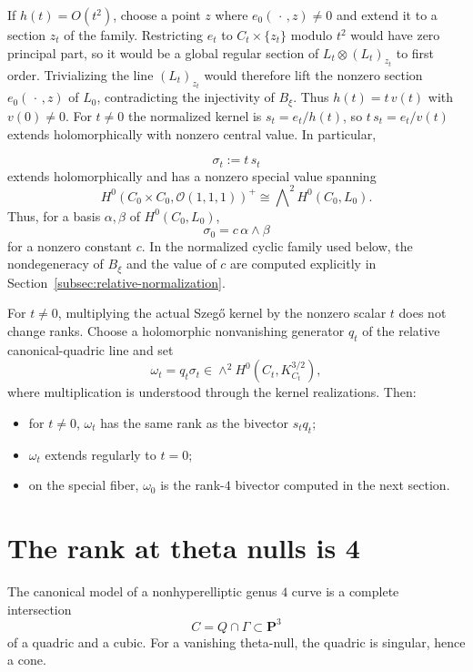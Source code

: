 \documentclass[10pt,a4paper]{amsart}
\newcommand{\OO}{\mathcal O}
\begin{document}
If $h(t)=O(t^2)$, choose a point $z$ where
$e_0(\,\cdot\,,z)\neq0$ and extend it to a section $z_t$ of the family.
Restricting $e_t$ to $C_t\times\{z_t\}$ modulo $t^2$ would have
zero principal part, so it would be a global regular section of
$L_t\otimes(L_t)_{z_t}$ to first order. Trivializing the line
$(L_t)_{z_t}$ would therefore lift the nonzero section
$e_0(\,\cdot\,,z)$ of $L_0$, contradicting the injectivity of $B_\xi$.
Thus $h(t)=t\,v(t)$ with $v(0)\neq0$. For $t\neq0$ the normalized
kernel is $s_t=e_t/h(t)$, so $t\,s_t=e_t/v(t)$ extends holomorphically
with nonzero central value. In particular,
\endgroup

\[
\sigma_t:=t\,s_t
\]
extends holomorphically and has a nonzero special value spanning
\[
{H^0(C_0\times C_0,\OO(1,1,1))^+}
\cong \bigwedge\nolimits^2H^0(C_0,L_0).
\]
Thus, for a basis $\alpha,\beta$ of $H^0(C_0,L_0)$,
\begin{equation}
\label{eq:sigma-zero-general-c}
\sigma_0=c\,\alpha\wedge\beta
\end{equation}
for a nonzero constant $c$.  In the normalized cyclic family used below,
the nondegeneracy of $B_\xi$ and the value of $c$ are computed explicitly
in Section~\ref{subsec:relative-normalization}.


For $t\neq 0$, multiplying the actual Szeg\H{o} kernel by the nonzero scalar $t$ does not change ranks.
{Choose a holomorphic nonvanishing generator $q_t$ of the relative
canonical-quadric line and set}
\[
{\omega_t=q_t\sigma_t\in\wedge^2H^0(C_t,K_{C_t}^{3/2}),}
\]
{where multiplication is understood through the kernel realizations.} Then:
\begin{itemize}[leftmargin=2em]
\item for $t\neq 0$, \(\omega_t\) has the same rank as {the bivector $s_tq_t$;}
\item \(\omega_t\) extends regularly to \(t=0\);
\item on the special fiber, \(\omega_0\) is the rank-$4$ bivector computed in the next section.
\end{itemize}

\section{The rank at theta nulls is 4}

The canonical model of a nonhyperelliptic genus $4$ curve is a complete intersection
\[
C=Q\cap \Gamma \subset \mathbf P^3
\]
of a quadric and a cubic. For a vanishing theta-null, the quadric is singular, hence a cone.
\end{document}
